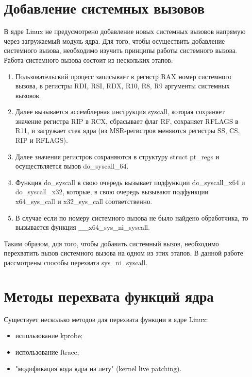 \documentclass{bmstu}
\begin{document}
\section{Добавление системных вызовов}
В ядре Linux не предусмотрено добавление новых системных вызовов напрямую через загружаемый модуль ядра. Для того, чтобы осуществить добавление системного вызова, необходимо изучить принципы работы системного вызова.
Работа системного вызова состоит из нескольких этапов:%
\begin{enumerate}
	\item Пользовательский процесс записывает в регистр RAX номер системного вызова, в регистры RDI, RSI, RDX, R10, R8, R9 аргументы системных вызовов.
	\item Далее вызывается ассемблерная инструкция syscall, которая сохраняет значение регистра RIP в RCX, сбрасывает флаг RF, сохраняет RFLAGS в R11, и загружает стек ядра (из MSR-регистров меняются регистры SS, CS, RIP и RFLAGS).
	\item Далее значения регистров сохраняются в структуру struct pt\_regs и осуществляется вызов do\_syscall\_64.
	\item Функция do\_syscall в свою очередь вызывает подфункции do\_syscall\_x64 и do\_syscall\_x32, которые, в свою очередь вызывают подфункции x64\_sys\_call и x32\_sys\_call соответственно. %
	\item В случае если по номеру системного вызова не было найдено обработчика, то вызывается функция \_\_x64\_sys\_ni\_syscall. %
\end{enumerate}

Таким образом, для того, чтобы добавить системный вызов, необходимо перехватить вызов системного вызова на одном из этих этапов. В данной работе рассмотрены способы перехвата sys\_ni\_syscall. %

\section{Методы перехвата функций ядра}
Существует несколько методов для перехвата функции в ядре Linux:
\begin{itemize}
	\item использование kprobe;
	\item использование ftrace;
	\item "модификация кода ядра на лету" (kernel live patching).
\end{itemize}
\end{document}

